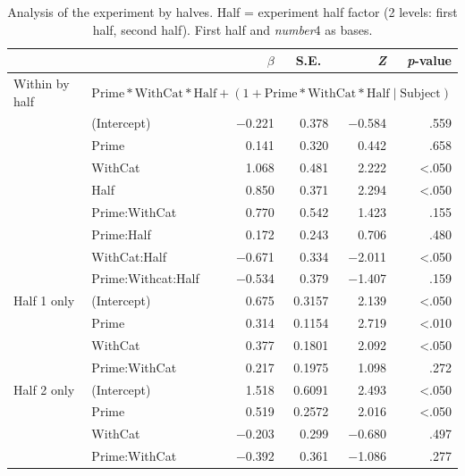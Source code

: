 \documentclass[10pt]{article}
\begin{document}
\begin{table}[h]
  \centering
  \begin{tabular}{llrrrr}
    \hline
     & & \(\beta\) & S.E.\ & \emph{Z} & \emph{p}-value  \\
    \hline
    Within by half & \multicolumn{5}{l}{\(\text{Prime} * \text{WithCat} * \text{Half} + (1 + \text{Prime} * \text{WithCat} * \text{Half} \mid \text{Subject})\)}  \\
    & (Intercept)        & \(-\)0.221 & 0.378 & \(-\)0.584 & .559 \\
    & Prime              &  0.141 & 0.320 &  0.442 & .658 \\
    & WithCat            &  1.068 & 0.481 &  2.222 & <.050 \\
    & Half               &  0.850 & 0.371 &  2.294 & <.050 \\
    & Prime:WithCat      &  0.770 & 0.542 &  1.423 & .155 \\
    & Prime:Half         &  0.172 & 0.243 &  0.706 & .480 \\
    & WithCat:Half       & \(-\)0.671 & 0.334 & \(-\)2.011 & <.050 \\
    & Prime:Withcat:Half & \(-\)0.534 & 0.379 & \(-\)1.407 & .159 \\
    Half 1 only & (Intercept)   & 0.675 & 0.3157 & 2.139 & <.050 \\
                & Prime         & 0.314 & 0.1154 & 2.719 & <.010 \\
                & WithCat       & 0.377 & 0.1801 & 2.092 & <.050 \\
                & Prime:WithCat & 0.217 & 0.1975 & 1.098 & .272 \\
    Half 2 only & (Intercept)   & 1.518 & 0.6091 & 2.493 & <.050 \\
                & Prime         & 0.519 & 0.2572 & 2.016 & <.050 \\
                & WithCat       & \(-\)0.203& 0.299 & \(-\)0.680& .497 \\
                & Prime:WithCat & \(-\)0.392& 0.361 & \(-\)1.086& .277 \\
    \hline
  \end{tabular}\vspace{-7pt}
  \caption{Analysis of the experiment by halves. Half = experiment half factor (2 levels: first half, second half). First half and \emph{number}4 as bases.}
  \label{tab:halves}
\end{table}
\end{document}

